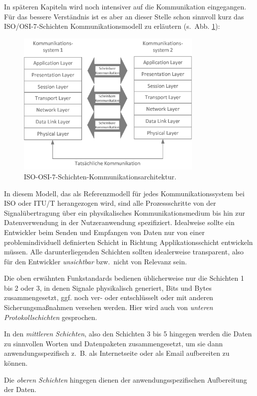 In späteren Kapiteln wird noch intensiver auf die Kommunikation eingegangen. Für das bessere Verständnis ist es aber an dieser Stelle schon sinnvoll kurz das ISO/OSI-7-Schichten Kommunikationsmodell zu erläutern (s.~Abb. \ref{fig_ISO-OSI}):
\begin{figure}[!ht]
\centering
\includegraphics[height=7cm]{your_content_folder/your_figures/fig_intro/ISO_OSI.png}
\caption{ISO-OSI-7-Schichten-Kommunikationsarchitektur.}
\label{fig_ISO-OSI}
\end{figure}
In diesem Modell, das als Referenzmodell für jedes Kommunikationssystem bei ISO oder ITU/T herangezogen wird, sind alle Prozessschritte von der Signalübertragung über ein physikalisches Kommunikationsmedium bis hin zur Datenverwendung in der Nutzeranwendung spezifiziert. Idealweise sollte ein Entwickler beim Senden und Empfangen von Daten nur von einer problemindividuell definierten Schicht in Richtung Applikationsschicht entwickeln müssen. Alle darunterliegenden Schichten sollten idealerweise transparent, also für den Entwickler \emph{unsichtbar} bzw.~nicht von Relevanz sein.

Die oben erwähnten Funkstandards bedienen üblicherweise nur die Schichten 1 bis 2 oder 3, in denen Signale physikalisch generiert, Bits und Bytes zusammengesetzt, ggf. noch ver- oder entschlüsselt oder mit anderen Sicherungsmaßnahmen versehen werden. Hier wird auch von \emph{unteren Protokollschichten} gesprochen.

In den \emph{mittleren Schichten}, also den Schichten 3 bis 5 hingegen werden die Daten zu sinnvollen Worten und Datenpaketen zusammengesetzt, um sie dann anwendungsspezifisch z.~B. als Internetseite oder als Email aufbereiten zu können. 

Die \emph{oberen Schichten} hingegen dienen der anwendungsspezifischen Aufbereitung der Daten.

